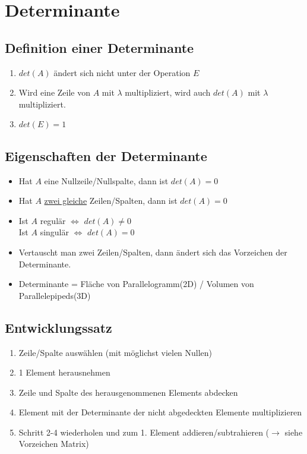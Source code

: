\section{Determinante}

\subsection{Definition einer Determinante}
	\begin{enumerate}
		\item $det(A)$ ändert sich nicht unter der Operation $E$
		\item Wird eine Zeile von $A$ mit $\lambda$ multipliziert, wird auch $det(A)$ mit $\lambda$ multipliziert.
		\item $det(E) = 1$
	\end{enumerate}

\subsection{Eigenschaften der Determinante}
	\begin{itemize}
		\item Hat $A$ eine Nullzeile/Nullspalte, dann ist $det(A) = 0$
		\item Hat $A$ \underline{zwei gleiche} Zeilen/Spalten, dann ist $det(A) = 0$
		\item Ist $A$ regulär $\Leftrightarrow$ $det(A) \neq 0$ \\
			Ist $A$ singulär $\Leftrightarrow$ $det(A) = 0$
		\item Vertauscht man zwei Zeilen/Spalten, dann ändert sich das Vorzeichen der Determinante.
		\item Determinante = Fläche von Parallelogramm(2D) / Volumen von Parallelepipeds(3D)
	\end{itemize}

\subsection{Entwicklungssatz}
	\begin{enumerate}
		\item Zeile/Spalte auswählen (mit möglichst vielen Nullen)
		\item 1 Element herausnehmen
		\item Zeile und Spalte des herausgenommenen Elements abdecken
		\item Element mit der Determinante der nicht abgedeckten Elemente multiplizieren
		\item Schritt 2-4 wiederholen und zum 1. Element addieren/subtrahieren ($\rightarrow$ siehe Vorzeichen Matrix)
	\end{enumerate}
	
